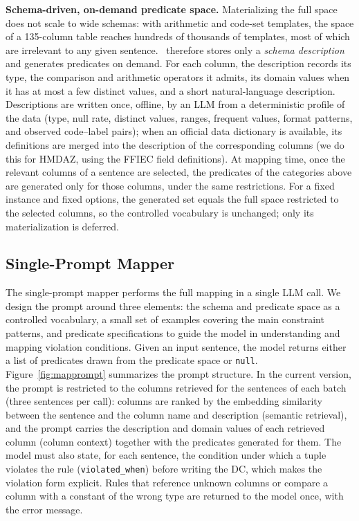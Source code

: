 \smallskip\noindent\textbf{Schema-driven, on-demand predicate space.}
Materializing the full space does not scale to wide schemas: with arithmetic and
code-set templates, the space of a 135-column table reaches hundreds of thousands
of templates, most of which are irrelevant to any given sentence. \system\
therefore stores only a \emph{schema description} and generates predicates on
demand. For each column, the description records its type, the comparison and
arithmetic operators it admits, its domain values when it has at most a few
distinct values, and a short natural-language description. Descriptions are
written once, offline, by an LLM from a deterministic profile of the data (type,
null rate, distinct values, ranges, frequent values, format patterns, and observed
code--label pairs); when an official data dictionary is available, its
definitions are merged into the description of the corresponding columns (we do
this for HMDAZ, using the FFIEC field definitions). At mapping time, once the
relevant columns of a sentence are selected, the predicates of the categories
above are generated only for those columns, under the same restrictions. For a
fixed instance and fixed options, the generated set equals the full space
restricted to the selected columns, so the controlled vocabulary is unchanged;
only its materialization is deferred.

\subsection{Single-Prompt Mapper}
\label{sec:mapper:llm}

The single-prompt mapper performs the full mapping in a single LLM call. 
We design the prompt around three elements: the schema and predicate space as a controlled vocabulary, a small set of examples covering the main constraint patterns, and predicate specifications to guide the model in understanding and mapping violation conditions. Given an input sentence, the model returns either a list of predicates drawn from the predicate space or \texttt{null}. 
Figure~\ref{fig:mapprompt} summarizes the prompt structure.
In the current version, the prompt is restricted to the columns retrieved for
the sentences of each batch (three sentences per call): columns are ranked by
the embedding similarity between the sentence and the column name and
description (semantic retrieval), and the prompt carries the description and
domain values of each retrieved column (column context) together with the
predicates generated for them. The model must also state, for each sentence,
the condition under which a tuple violates the rule (\texttt{violated\_when})
before writing the DC, which makes the violation form explicit. Rules that
reference unknown columns or compare a column with a constant of the wrong type
are returned to the model once, with the error message.





